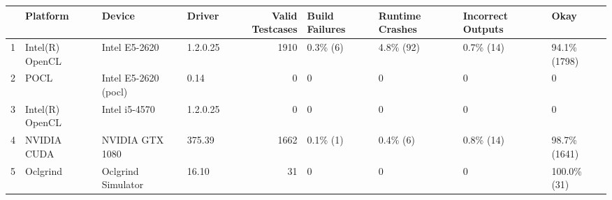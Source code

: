 \begin{tabular}{llllrllll}
\toprule
{} &         Platform &                Device &    Driver &  Valid Testcases & Build Failures & Runtime Crashes & Incorrect Outputs &          Okay \\
\midrule
1 &  Intel(R) OpenCL &         Intel E5-2620 &  1.2.0.25 &             1910 &       0.3\% (6) &       4.8\% (92) &         0.7\% (14) &  94.1\% (1798) \\
2 &             POCL &  Intel E5-2620 (pocl) &      0.14 &                0 &              0 &               0 &                 0 &             0 \\
3 &  Intel(R) OpenCL &         Intel i5-4570 &  1.2.0.25 &                0 &              0 &               0 &                 0 &             0 \\
4 &      NVIDIA CUDA &       NVIDIA GTX 1080 &    375.39 &             1662 &       0.1\% (1) &        0.4\% (6) &         0.8\% (14) &  98.7\% (1641) \\
5 &         Oclgrind &    Oclgrind Simulator &     16.10 &               31 &              0 &               0 &                 0 &   100.0\% (31) \\
\bottomrule
\end{tabular}

